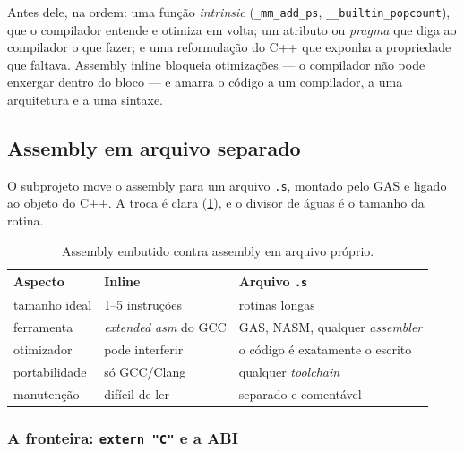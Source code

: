 \begin{regra}
Antes dele, na ordem: uma função \emph{intrinsic} (\texttt{\_mm\_add\_ps},
\texttt{\_\_builtin\_popcount}), que o compilador entende e otimiza em volta;
um atributo ou \emph{pragma} que diga ao compilador o que fazer; e uma
reformulação do C++ que exponha a propriedade que faltava. Assembly inline
bloqueia otimizações --- o compilador não pode enxergar dentro do bloco --- e
amarra o código a um compilador, a uma arquitetura e a uma sintaxe.
\end{regra}

\subsection{Assembly em arquivo separado}
\label{sec:outline-asm}

O subprojeto  move o assembly para um arquivo
\texttt{.s}, montado pelo GAS e ligado ao objeto do C++. A troca é clara
(\cref{tab:inline-outline}), e o divisor de águas é o tamanho da rotina.

\begin{table}[htbp]
\centering
\caption{Assembly embutido contra assembly em arquivo próprio.}
\label{tab:inline-outline}
\footnotesize
\begin{tabular}{@{}lll@{}}
\toprule
\textbf{Aspecto} & \textbf{Inline} & \textbf{Arquivo \texttt{.s}} \\
\midrule
tamanho ideal    & 1--5 instruções          & rotinas longas \\
ferramenta       & \emph{extended asm} do GCC & GAS, NASM, qualquer \emph{assembler} \\
otimizador       & pode interferir           & o código é exatamente o escrito \\
portabilidade    & só GCC/Clang              & qualquer \emph{toolchain} \\
manutenção       & difícil de ler            & separado e comentável \\
\bottomrule
\end{tabular}
\end{table}

\subsubsection{A fronteira: \texttt{extern "C"} e a ABI}

